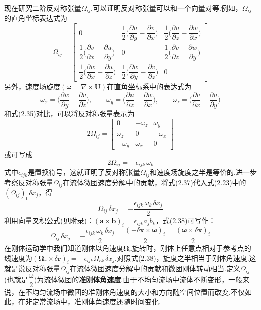 现在研究二阶反对称张量$\Omega_{ij}$.可以证明反对称张量可以和一个向量对等.例如，$\Omega_{ij}$的直角坐标表达式为
\begin{equation*}
\Omega_{ij}=\begin{bmatrix}
0 & \dfrac{1}{2}\Big(\dfrac{\partial u}{\partial y}-\dfrac{\partial v}{\partial x}\Big) & \dfrac{1}{2}\Big(\dfrac{\partial u}{\partial z}-\dfrac{\partial w}{\partial x}\Big)\\[12pt]
\dfrac{1}{2}\Big(\dfrac{\partial v}{\partial x}-\dfrac{\partial u}{\partial y}\Big) & 0 & \dfrac{1}{2}\Big(\dfrac{\partial v}{\partial z}-\dfrac{\partial w}{\partial y}\Big)\\[12pt]
\dfrac{1}{2}\Big(\dfrac{\partial w}{\partial x}-\dfrac{\partial u}{\partial z}\Big) & \dfrac{1}{2}\Big(\dfrac{\partial w}{\partial y}-\dfrac{\partial v}{\partial z}\Big) & 0
\end{bmatrix}
\tag{2.35}
\end{equation*}
另外，速度场旋度$(\boldsymbol{\omega}=\nabla\times\boldsymbol{U})$在直角坐标系中的表达式为
\begin{equation*}
\omega_x=\Big(\frac{\partial w}{\partial y}-\frac{\partial v}{\partial z}\Big),\qquad \omega_y=\Big(\frac{\partial u}{\partial z}-\frac{\partial w}{\partial x}\Big),\qquad \omega_z=\Big(\frac{\partial v}{\partial x}-\frac{\partial u}{\partial y}\Big)
\tag{2.36}
\end{equation*}
和式(2.35)对比，可以将反对称张量表示为
\[
2\Omega_{ij}=\begin{bmatrix}
0 & -\omega_z & \omega_y\\
\omega_z & 0 & -\omega_x\\
-\omega_y & \omega_x & 0
\end{bmatrix}
\]
或可写成
\begin{equation*}
2\Omega_{ij}=-\epsilon_{ijk}\,\omega_k
\tag{2.37}
\end{equation*}
式中$\epsilon_{ijk}$是置换符号，这就证明了反对称张量$\Omega_{ij}$和速度场旋度之半是等价的.进一步考察反对称张量$\Omega_{ij}$在流体微团速度分解中的贡献，将式(2.37)代入式(2.23)中的$(\Omega_{ij})_0\delta x_j$，得
\begin{equation*}
\Omega_{ij}\,\delta x_j=-\frac{\epsilon_{ijk}\,\omega_k\,\delta x_j}{2}
\tag{2.38}
\end{equation*}
利用向量叉积公式(见附录)：$(\boldsymbol{a}\times\boldsymbol{b})_i=\epsilon_{ijk}a_jb_k$，式(2.38)可写作：
\[
\Omega_{ij}\,\delta x_j=-\frac{\epsilon_{ijk}\,\omega_k\,\delta x_j}{2}=\frac{(-\delta\boldsymbol{x}\times\boldsymbol{\omega})_i}{2}=\frac{(\boldsymbol{\omega}\times\delta\boldsymbol{x})_i}{2}
\]
在刚体运动学中我们知道刚体以角速度$\boldsymbol{\Omega}_r$旋转时，刚体上任意点相对于参考点的线速度为$(\boldsymbol{\Omega}_r\times\delta\boldsymbol{r})_i=-\epsilon_{ijk}\Omega_{rk}\,\delta x_j$.对照式(2.38)，旋度之半相当于刚体角速度.这就是说反对称张量$\Omega_{ij}$在流体微团速度分解中的贡献和微团刚体转动相当.定义$\Omega_{ij}$(也就是$\dfrac{\boldsymbol{\omega}}{2}$)为流体微团的\textbf{准刚体角速度}.由于不均匀流场中流体不断变形，一般来说，在不均匀流场中微团的准刚体角速度的大小和方向随空间位置而改变.不仅如此，在非定常流场中，准刚体角速度还随时间变化.

